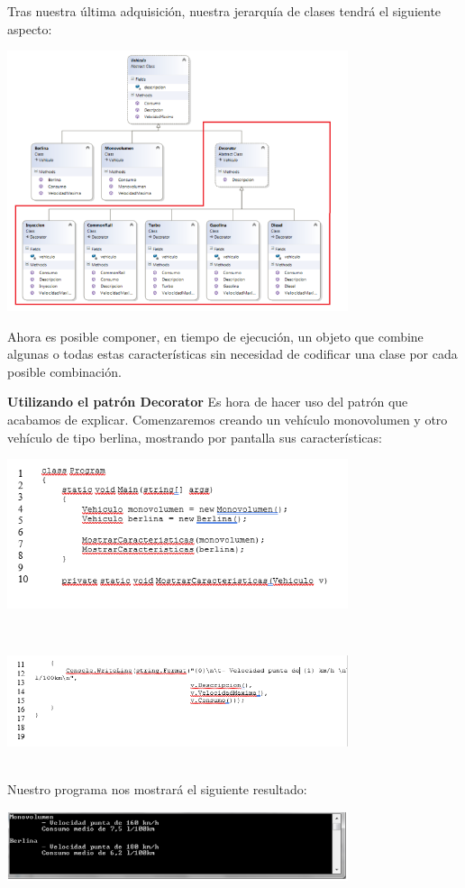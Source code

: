 \begin{flushleft}
Tras nuestra última adquisición, nuestra jerarquía de clases tendrá el siguiente aspecto:

\begin{center}
	\includegraphics[width=10cm]{./Imagenes/decorator12} 
	\end{center}

Ahora es posible componer, en tiempo de ejecución, un objeto que combine algunas o todas estas características sin necesidad de codificar una clase por cada posible combinación.

\textbf{Utilizando el patrón Decorator}
Es hora de hacer uso del patrón que acabamos de explicar. Comenzaremos creando un vehículo monovolumen y otro vehículo de tipo berlina, mostrando por pantalla sus características:
\begin{center}
	\includegraphics[width=10cm]{./Imagenes/decorator13} 
	\end{center}
\textbf{}\\ 
\begin{center}
	\includegraphics[width=10cm]{./Imagenes/decorator14} 
	\end{center}
\textbf{}\\ 
Nuestro programa nos mostrará el siguiente resultado:
\textbf{}\\ 
\begin{center}
	\includegraphics[width=10cm]{./Imagenes/decorator15} 
	\end{center}
\textbf{}\\ 


\end{flushleft}
